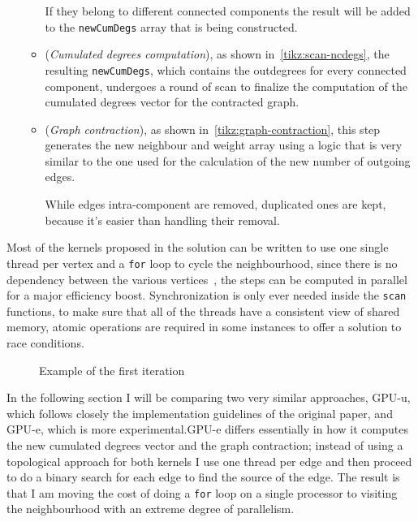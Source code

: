 \documentclass[a4paper,10pt]{article}
\begin{document}
\begin{enumerate}
\begin{itemize}
		If they belong to different connected components the result will be added to the \texttt{newCumDegs} array that is being constructed.
		\item\label{item:scan-ncd} (\textit{Cumulated degrees computation}), as shown in~\ref{tikz:scan-ncdegs}, the resulting \texttt{newCumDegs}, which contains the outdegrees for every connected component, undergoes a round of scan to finalize the computation of the cumulated degrees vector for the contracted graph.
		\item\label{item:graph-regen} (\textit{Graph contraction}), as shown in~\ref{tikz:graph-contraction}, this step generates the new neighbour and weight array using a logic that is very similar to the one used for the calculation of the new number of outgoing edges.
		
		While edges intra-component are removed, duplicated ones are kept, because it's easier than handling their removal.
	\end{itemize}
\end{enumerate}
Most of the kernels proposed in the solution can be written to use one single thread per vertex and a \texttt{for} loop to cycle the neighbourhood, since there is no dependency between the various vertices~\cite{generic-he-boruvka}, the steps can be computed in parallel for a major efficiency boost. Synchronization is only ever needed inside the \texttt{scan} functions, to make sure that all of the threads have a consistent view of shared memory, atomic operations are required in some instances to offer a solution to race conditions.
\begin{figure}
	
	\caption{Example of the first iteration}\label{tikz:first-iteration}
\end{figure}
In the following section I will be comparing two very similar approaches, GPU-u, which follows closely the implementation guidelines of the original paper, and GPU-e, which is more experimental.GPU-e differs essentially in how it computes the new cumulated degrees vector and the graph contraction; instead of using a topological approach for both kernels I use one thread per edge and then proceed to do a binary search for each edge to find the source of the edge. The result is that I am moving the cost of doing a \texttt{for} loop on a single processor to visiting the neighbourhood with an extreme degree of parallelism.
\end{document}
